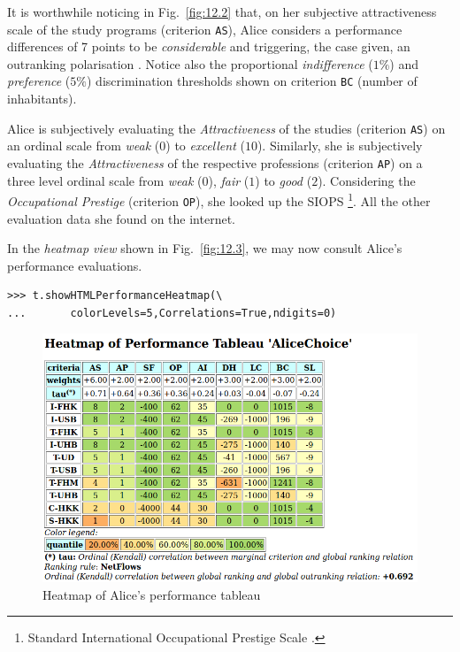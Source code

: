 It is worthwhile noticing in Fig.~\vref{fig:12.2} that, on her subjective attractiveness scale of the study programs (criterion \texttt{AS}), Alice considers a performance differences of 7 points to be \emph{considerable} and triggering, the case given, an outranking polarisation \citep{BIS-2013}. Notice also the proportional \emph{indifference} ($1\%$) and \emph{preference} ($5\%$) discrimination thresholds shown on criterion \texttt{BC} (number of inhabitants).

Alice is subjectively evaluating the \emph{Attractiveness} of the studies (criterion \texttt{AS}) on an ordinal scale from \emph{weak} ($0$) to \emph{excellent} ($10$). Similarly, she is subjectively evaluating the \emph{Attractiveness} of the respective professions (criterion \texttt{AP}) on a three level ordinal scale from \emph{weak} ($0$), \emph{fair} ($1$) to \emph{good} ($2$). Considering the \emph{Occupational Prestige} (criterion \texttt{OP}), she looked up the SIOPS \footnote{Standard International Occupational Prestige Scale \citep*{GAN-1996}.}. All the other evaluation data she found on the internet.

In the \emph{heatmap view} shown in Fig.~\vref{fig:12.3}, we may now consult Alice's performance evaluations.
\begin{lstlisting}
>>> t.showHTMLPerformanceHeatmap(\
...       colorLevels=5,Correlations=True,ndigits=0)
\end{lstlisting}
\begin{figure}[ht]
\includegraphics[width=\hsize]{Figures/12-3-aliceHeatmap.png}
\caption{Heatmap of Alice's performance tableau}
\label{fig:12.3}       %
\end{figure}

